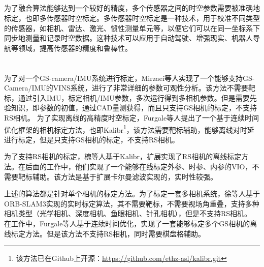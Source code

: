 \documentclass[12pt, twocolumn]{article}
\newcommand\normf{\fangsong}
\begin{document}
	
	\subsection{\normf{时空标定}}
	为了融合算法能够达到一个较好的精度，多个传感器之间的时空参数需要被准确地标定，也即多传感器时空标定。多传感器时空标定是一种技术，用于校准不同类型的传感器，如相机、雷达、激光、惯性测量单元等，以便它们可以在同一坐标系下同步地测量和记录时空数据。这种技术可以应用于自动驾驶、增强现实、机器人导航等领域，提高传感器的精度和鲁棒性。
	
	\section{\normf{文献调研}}
	为了对一个GS-camera/IMU系统进行标定，Mirzaei等人\cite{mirzaei2008kalman}实现了一个能够支持GS-Camera/IMU的VINS系统，进行了非常详细的参数可观性分析。该方法不需要靶标，通过引入IMU，标定相机/IMU参数，多次运行得到多相机参数。但是需要先验知识，即参数的初值，通过CAD量测获得，而且只支持GS相机的标定，不支持RS相机。
	为了实现离线的高精度时空标定，Furgale等人\cite{furgale2013unified}提出了一个基于连续时间优化框架的相机标定方法，也即Kalibr\footnote{\normf 该方法已在Github上开源：\url{https://github.com/ethz-asl/kalibr.git}}，该方法需要靶标辅助，能够离线对时延进行标定，但是只支持GS相机的标定，不支持RS相机。
	
	为了支持RS相机的标定，槐等人\cite{huai2022continuous}基于Kalibr，扩展实现了RS相机的离线标定方法。在后面的工作中\cite{huai2022observability}，他们实现了一个能够在线标定外参、时参、内参的VIO，不需要靶标辅助。该方法是基于扩展卡尔曼滤波实现的，实时性较强。
	
	上述的算法都是针对单个相机的标定方法。为了标定一套多相机系统，徐等人\cite{xu2022cammap}基于ORB-SLAM3实现的实时标定算法，其不需要靶标，不需要视场角重叠，支持多种相机类型（光学相机、深度相机、鱼眼相机、针孔相机），但是不支持RS相机。
	在工作\cite{furgale2012continuous}中，Furgale等人基于连续时间优化，实现了一套能够标定多个GS相机的离线标定方法。但是该方法不支持RS相机，同时需要棋盘格辅助。
	
\end{document}
